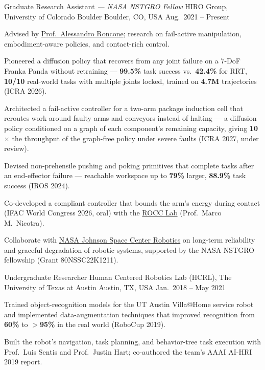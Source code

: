 
\begin{cventries}

  \cventry
    {Graduate Research Assistant {\normalfont\itshape --- NASA NSTGRO Fellow}}
    {HIRO Group, University of Colorado Boulder}
    {Boulder, CO, USA}
    {Aug.\ 2021 -- Present}
    {
      \begin{cvitems}
        \item Advised by \href{https://hiro-group.ronc.one/}{Prof.\ Alessandro Roncone}; research on fail-active manipulation, embodiment-aware policies, and contact-rich control.
        \item Pioneered a diffusion policy that recovers from any joint failure on a 7-DoF Franka Panda without retraining --- \textbf{99.5\%} task success vs.\ \textbf{42.4\%} for RRT, \textbf{10/10} real-world tasks with multiple joints locked, trained on \textbf{4.7M} trajectories (ICRA 2026).
        \item Architected a fail-active controller for a two-arm package induction cell that reroutes work around faulty arms and conveyors instead of halting --- a diffusion policy conditioned on a graph of each component's remaining capacity, giving \textbf{10$\times$} the throughput of the graph-free policy under severe faults (ICRA 2027, under review).
        \item Devised non-prehensile pushing and poking primitives that complete tasks after an end-effector failure --- reachable workspace up to \textbf{79\%} larger, \textbf{88.9\%} task success (IROS 2024).
        \item Co-developed a compliant controller that bounds the arm's energy during contact (IFAC World Congress 2026, oral) with the \href{https://www.colorado.edu/faculty/nicotra/robotics-optimization-and-constrained-control}{ROCC Lab} (Prof.\ Marco M.\ Nicotra).
        \item Collaborate with \href{https://www.nasa.gov/reference/jsc-robotics/}{NASA Johnson Space Center Robotics} on long-term reliability and graceful degradation of robotic systems, supported by the NASA NSTGRO fellowship (Grant 80NSSC22K1211).
      \end{cvitems}
    }

  \cventry
    {Undergraduate Researcher}
    {Human Centered Robotics Lab (HCRL), The University of Texas at Austin}
    {Austin, TX, USA}
    {Jan.\ 2018 -- May 2021}
    {
      \begin{cvitems}
        \item Trained object-recognition models for the UT Austin Villa@Home service robot and implemented data-augmentation techniques that improved recognition from \textbf{60\%} to \textbf{$>$95\%} in the real world (RoboCup 2019).
        \item Built the robot's navigation, task planning, and behavior-tree task execution with Prof.\ Luis Sentis and Prof.\ Justin Hart; co-authored the team's AAAI AI-HRI 2019 report.
      \end{cvitems}
    }

\end{cventries}
